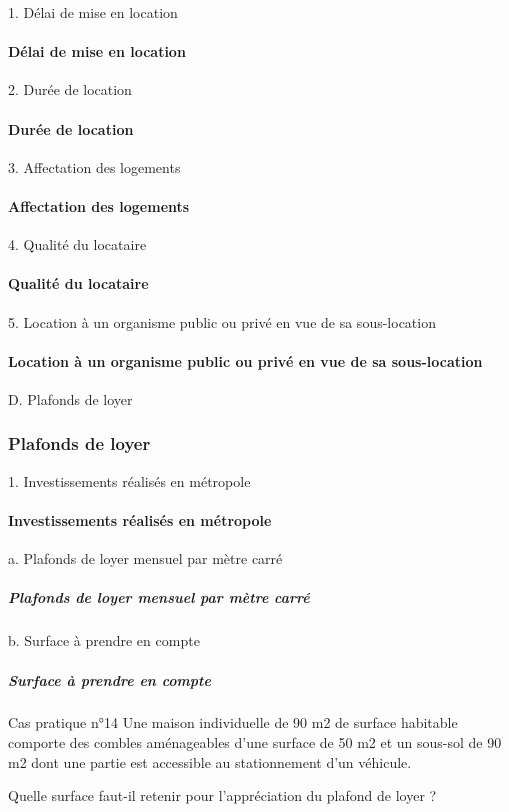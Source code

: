 1. Délai de mise en location
				\paragraph{Délai de mise en location}

2. Durée de location
				\paragraph{Durée de location}

3. Affectation des logements
				\paragraph{Affectation des logements}

4. Qualité du locataire
				\paragraph{Qualité du locataire}

5. Location à un organisme public ou privé en vue de sa sous-location
				\paragraph{Location à un organisme public ou privé en vue de sa sous-location}


D. Plafonds de loyer
			\subsubsection{Plafonds de loyer}


1. Investissements réalisés en métropole
				\paragraph{Investissements réalisés en métropole}

a. Plafonds de loyer mensuel par mètre carré
					\subparagraph{Plafonds de loyer mensuel par mètre carré}

b. Surface à prendre en compte
					\subparagraph{Surface à prendre en compte}


Cas pratique n°14
Une maison individuelle de 90 m2 de surface habitable comporte des combles aménageables d'une surface de 50 m2 et un sous-sol de 90 m2 dont une partie est accessible au stationnement d'un véhicule.

Quelle surface faut-il retenir pour l’appréciation du plafond de loyer ?


